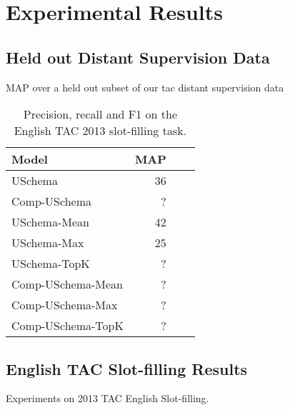 \section{Experimental Results\label{sec:results}}


\subsection {Held out Distant Supervision Data}
MAP over a held out subset of our tac distant supervision data


\begin{table}[h!]
\setlength{\tabcolsep}{4.1pt}
\begin{center}
\begin{tabular}{|lrrr|}
\hline
\bf Model & MAP \\
\hline\hline
USchema              & 36 \\
Comp-USchema         & ?  \\
\hline\hline
USchema-Mean         & 42 \\
USchema-Max          & 25  \\
USchema-TopK         & ?  \\
Comp-USchema-Mean    & ?  \\
Comp-USchema-Max     & ? \\
Comp-USchema-TopK    & ?  \\
\hline\hline

\hline
\end{tabular}
\caption{Precision, recall and F1 on the English TAC 2013 slot-filling task.
\label{en-tac-table}}
\end{center}
\vspace{-.3cm}
\end{table}


\subsection {English TAC Slot-filling Results}
Experiments on 2013 TAC English Slot-filling.


